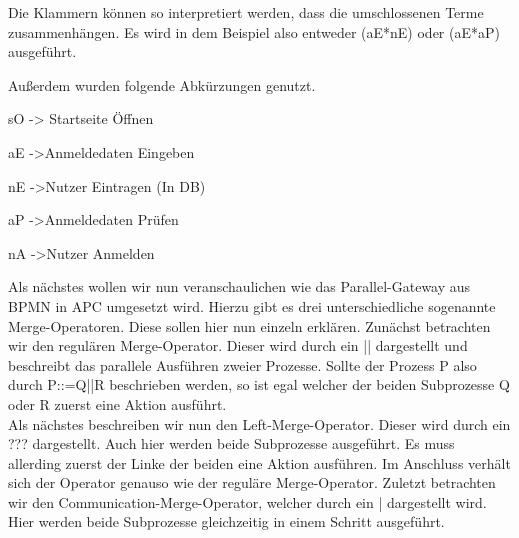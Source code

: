 Die Klammern können so interpretiert werden, dass die umschlossenen Terme zusammenhängen. Es wird in dem Beispiel also entweder (aE*nE) oder (aE*aP) ausgeführt.

Außerdem wurden folgende Abkürzungen genutzt.

sO -> Startseite Öffnen

aE ->Anmeldedaten Eingeben

nE ->Nutzer Eintragen (In DB)

aP ->Anmeldedaten Prüfen

nA ->Nutzer Anmelden

Als nächstes wollen wir nun veranschaulichen wie das Parallel-Gateway aus BPMN in APC umgesetzt wird. Hierzu gibt es drei unterschiedliche sogenannte Merge-Operatoren. Diese sollen hier nun einzeln erklären.
Zunächst betrachten wir den regulären Merge-Operator. Dieser wird durch ein || dargestellt und beschreibt das parallele Ausführen zweier Prozesse. Sollte der Prozess P also durch P::=Q||R beschrieben werden, so ist egal welcher der beiden Subprozesse Q oder R zuerst eine Aktion ausführt.\\
Als nächstes beschreiben wir nun den Left-Merge-Operator. Dieser wird durch ein ??? dargestellt. Auch hier werden beide Subprozesse ausgeführt. Es muss allerding zuerst der Linke der beiden eine Aktion ausführen. Im Anschluss verhält sich der Operator genauso wie der reguläre Merge-Operator. Zuletzt betrachten wir den Communication-Merge-Operator, welcher durch ein | dargestellt wird. Hier werden beide Subprozesse gleichzeitig in einem Schritt ausgeführt. 



